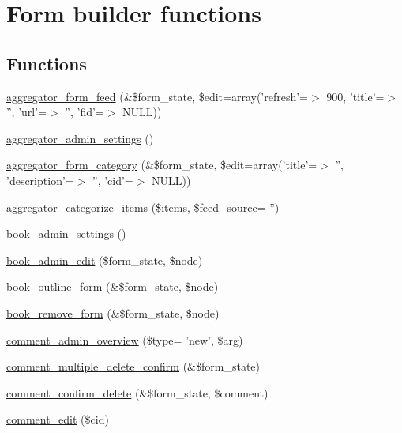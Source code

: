 \hypertarget{group__forms}{
\section{Form builder functions}
\label{group__forms}
}
\subsection*{Functions}
\begin{CompactItemize}
\item 
\hyperlink{group__forms_gf9a13eb9b0448eec9662f0b73c930bca}{aggregator\_\-form\_\-feed} (\&\$form\_\-state, \$edit=array('refresh'=$>$ 900, 'title'=$>$ '', 'url'=$>$ '', 'fid'=$>$ NULL))
\item 
\hyperlink{group__forms_gfd14b28c0d63cab57fe23fbbb60bc479}{aggregator\_\-admin\_\-settings} ()
\item 
\hyperlink{group__forms_g2d93d2170760482c7f1fc28ae1549769}{aggregator\_\-form\_\-category} (\&\$form\_\-state, \$edit=array('title'=$>$ '', 'description'=$>$ '', 'cid'=$>$ NULL))
\item 
\hyperlink{group__forms_gd110881d125af4a6c5c2182a52fe4c69}{aggregator\_\-categorize\_\-items} (\$items, \$feed\_\-source= '')
\item 
\hyperlink{group__forms_g036f1d2ed17d79b71545c955c864cf2e}{book\_\-admin\_\-settings} ()
\item 
\hyperlink{group__forms_g3add8d3b6439de3883a30986428fdc87}{book\_\-admin\_\-edit} (\$form\_\-state, \$node)
\item 
\hyperlink{group__forms_g63f60eeeafbddc518906941101553538}{book\_\-outline\_\-form} (\&\$form\_\-state, \$node)
\item 
\hyperlink{group__forms_g4cd634d95539957d72f2efbe228769f7}{book\_\-remove\_\-form} (\&\$form\_\-state, \$node)
\item 
\hyperlink{group__forms_g00b5469fd2c8930040e5e3170a8ac0bd}{comment\_\-admin\_\-overview} (\$type= 'new', \$arg)
\item 
\hyperlink{group__forms_gb4ac3160c4ff7fd609772342f0df02a8}{comment\_\-multiple\_\-delete\_\-confirm} (\&\$form\_\-state)
\item 
\hyperlink{group__forms_g412ca079e734ea4128aa16477141b82c}{comment\_\-confirm\_\-delete} (\&\$form\_\-state, \$comment)
\item 
\hyperlink{group__forms_g3679a2cbccaa0c479918ff54748d5334}{comment\_\-edit} (\$cid)
\item 

\end{CompactItemize}
